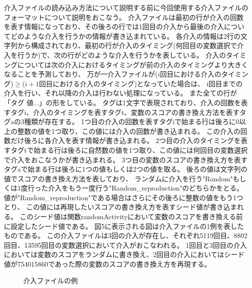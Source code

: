 介入ファイルの読み込み方法について説明する前に今回使用する介入ファイルのフォーマットについて説明をおこなう。
介入ファイルは最初の行が介入の回数を表す情報になっており、その後ろの行では1回目の介入から最後の介入についてどのような介入を行うかの情報が書き込まれている。
各介入の情報は2行の文字列から構成されており、最初の行が介入のタイミング(何回目の変数選択で介入を行うか)で、次の行がどのような介入を行うかを表している。
介入のタイミングについては次の介入におけるタイミングが前の介入のタイミングより大きくなることを予測しており、
万が一介入ファイルが($i$回目における介入のタイミング)$\geq$($i+1$回目における介入のタイミング)となっていた場合は、
i回目までの介入を行い、それ以降の介入は行わない処理になっている。
また全ての行が「タグ 値...」の形をしている。
タグは1文字で表現されており、介入の回数を表すタグi、介入のタイミングを表すタグt、変数のスコアの書き換え方法を表すタグaの3種類が存在する。
1つ目の介入の回数を表すタグiで始まる行は後ろに0以上の整数の値を1つ取り、この値には介入の回数が書き込まれる。
この介入の回数だけ後ろに各介入を表す情報が書き込まれる。
2つ目の介入のタイミングを表すタグtで始まる行は後ろに自然数の値を1つ取り、この値には何回目の変数選択で介入をおこなうかが書き込まれる。
3つ目の変数のスコアの書き換え方を表すタグaで始まる行は後ろに1つの値もしくは2つの値を取る。
後ろの値は文字列の値でスコアの書き換え方法を表しており、
ランダムに介入を行う"Random"もしくは1度行った介入をもう一度行う"Random\_reproduction"のどちらかをとる。
値が"Random\_reproduction"である場合はさらにその後ろに整数の値をもう1つとり、
この値には再現したいスコアの書き換え方を表すシード値が書き込まれる。
このシード値は関数randomActivityにおいて変数のスコアを書き換える前に設定したシード値である。
図5に表示される図は介入ファイルの1例を表したものである。
この介入ファイルは3回の介入が存在し、それぞれ5119回目、8802回目、13595回目の変数選択において介入がおこなわれる。
1回目と3回目の介入においては変数のスコアをランダムに書き換え、2回目の介入においてはシード値が754015860であった際の変数のスコアの書き換え方を再現する。
\begin{figure}[t]
   	\caption{介入ファイルの例}
\end{figure}

